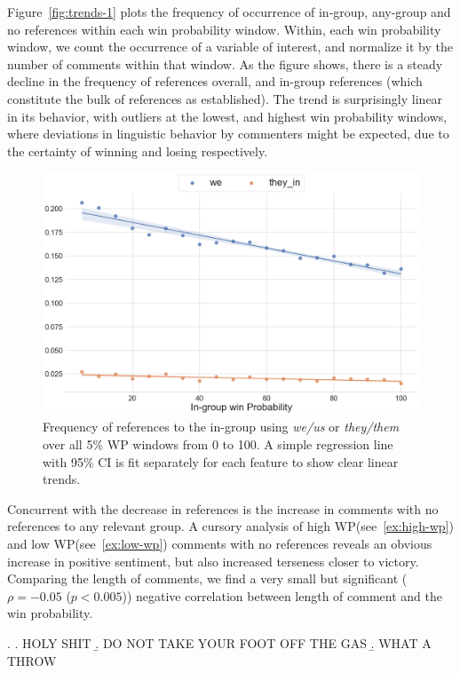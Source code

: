 Figure~\ref{fig:trends-1} plots the frequency of occurrence of in-group, any-group and no references within each win probability window. Within, each win probability window, we count the occurrence of a variable of interest, and normalize it by the number of comments within that window. As the figure shows, there is a steady decline in the frequency of references overall, and in-group references (which constitute the bulk of references as established). The trend is surprisingly linear in its behavior, with outliers at the lowest, and highest win probability windows, where deviations in linguistic behavior by commenters might be expected, due to the certainty of winning and losing respectively.

\begin{figure}[t]
     \centering
     \includegraphics[width=\linewidth]{figures/trends-2.png}
     \caption{Frequency of references to the in-group using \emph{we/us} or \emph{they/them} over all 5\% WP windows from 0 to 100. A simple regression line with 95\% CI is fit separately for each feature to show clear linear trends.}
     \label{fig:trends-2}
 \end{figure}

Concurrent with the decrease in references is the increase in comments with no references to any relevant group. A cursory analysis of high WP(see~\ref{ex:high-wp}) and low WP(see~\ref{ex:low-wp}) comments with no references reveals an obvious increase in positive sentiment, but also increased terseness closer to victory. Comparing the length of comments, we find a very small but significant ($\rho=-0.05$ ($p<0.005$)) negative correlation between length of comment and the win probability.

\ex.\label{ex:high-wp} \a. HOLY SHIT 
     \b. DO NOT TAKE YOUR FOOT OFF THE GAS
     \b. WHAT A THROW
     
